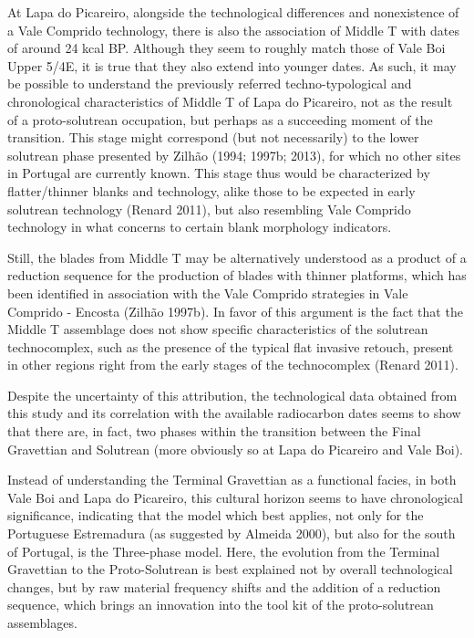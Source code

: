 \documentclass[12pt,twoside]{reedthesis}
\begin{document}
At Lapa do Picareiro, alongside the technological differences and nonexistence of a Vale Comprido technology, there is also the association of Middle T with dates of around 24 kcal BP. Although they seem to roughly match those of Vale Boi Upper 5/4E, it is true that they also extend into younger dates. As such, it may be possible to understand the previously referred techno-typological and chronological characteristics of Middle T of Lapa do Picareiro, not as the result of a proto-solutrean occupation, but perhaps as a succeeding moment of the transition. This stage might correspond (but not necessarily) to the lower solutrean phase presented by Zilhão (1994; 1997b; 2013), for which no other sites in Portugal are currently known. This stage thus would be characterized by flatter/thinner blanks and technology, alike those to be expected in early solutrean technology (Renard 2011), but also resembling Vale Comprido technology in what concerns to certain blank morphology indicators.

Still, the blades from Middle T may be alternatively understood as a product of a reduction sequence for the production of blades with thinner platforms, which has been identified in association with the Vale Comprido strategies in Vale Comprido - Encosta (Zilhão 1997b). In favor of this argument is the fact that the Middle T assemblage does not show specific characteristics of the solutrean technocomplex, such as the presence of the typical flat invasive retouch, present in other regions right from the early stages of the technocomplex (Renard 2011).

Despite the uncertainty of this attribution, the technological data obtained from this study and its correlation with the available radiocarbon dates seems to show that there are, in fact, two phases within the transition between the Final Gravettian and Solutrean (more obviously so at Lapa do Picareiro and Vale Boi).

Instead of understanding the Terminal Gravettian as a functional facies, in both Vale Boi and Lapa do Picareiro, this cultural horizon seems to have chronological significance, indicating that the model which best applies, not only for the Portuguese Estremadura (as suggested by Almeida 2000), but also for the south of Portugal, is the Three-phase model. Here, the evolution from the Terminal Gravettian to the Proto-Solutrean is best explained not by overall technological changes, but by raw material frequency shifts and the addition of a reduction sequence, which brings an innovation into the tool kit of the proto-solutrean assemblages.
\end{document}

